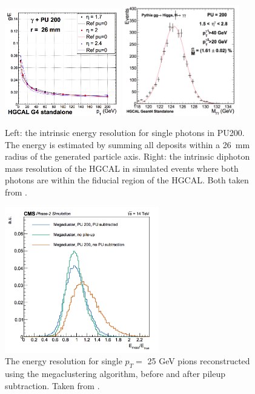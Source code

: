 \begin{figure}[h!]
\begin{centering}
\includegraphics[width=0.45\textwidth]{Figures/HGCAL/SinglePhotonReso.png}
\includegraphics[width=0.45\textwidth]{Figures/HGCAL/HggReso.png}
\caption{
Left: the intrinsic energy resolution for single photons in PU200. The energy is estimated by summing all deposits within a \SI{26}{mm} radius of the generated particle axis. 
Right: the intrinsic diphoton mass resolution of the HGCAL in simulated \Hgg events where both photons are within the fiducial region of the HGCAL. Both taken from \cite{HGCAL}.}
\label{fig:PhotonReso}
\end{centering}
\end{figure}

\begin{figure}[h!]
\begin{centering}
\includegraphics[width=0.6\textwidth]{Figures/HGCAL/SingleMegacluster.png}
\caption{The energy resolution for single $p_{T} =$ 25 GeV pions reconstructed using the megaclustering algorithm, before and after pileup subtraction. Taken from \cite{HGCAL}.}
\label{fig:SingleMegacluster}
\end{centering}
\end{figure}

